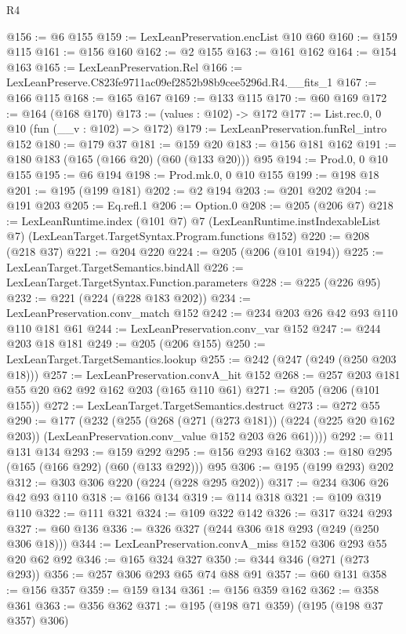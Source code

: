 \begin{lexlean}{R4}
\begin{coremodule}
@156 := @6 @155
@159 := LexLeanPreservation.encList @10 @60
@160 := @159 @115
@161 := @156 @160
@162 := @2 @155
@163 := @161 @162
@164 := @154 @163
@165 := LexLeanPreservation.Rel
@166 := LexLeanPreserve.C823fe9711ac09ef2852b98b9cee5296d.R4.__fits_1
@167 := @166 @115
@168 := @165 @167
@169 := @133 @115
@170 := @60 @169
@172 := @164 (@168 @170)
@173 := (values : @102) -> @172
@177 := List.rec.{0, 0} @10 (fun (__v : @102) => @172)
@179 := LexLeanPreservation.funRel_intro @152
@180 := @179 @37
@181 := @159 @20
@183 := @156 @181 @162
@191 := @180 @183 (@165 (@166 @20) (@60 (@133 @20))) @95
@194 := Prod.{0, 0} @10 @155
@195 := @6 @194
@198 := Prod.mk.{0, 0} @10 @155
@199 := @198 @18
@201 := @195 (@199 @181)
@202 := @2 @194
@203 := @201 @202
@204 := @191 @203
@205 := Eq.refl.{1}
@206 := Option.{0}
@208 := @205 (@206 @7)
@218 := LexLeanRuntime.index
    (@101 @7)
    @7
    (LexLeanRuntime.instIndexableList @7)
    (LexLeanTarget.TargetSyntax.Program.functions @152)
@220 := @208 (@218 @37)
@221 := @204 @220
@224 := @205 (@206 (@101 @194))
@225 := LexLeanTarget.TargetSemantics.bindAll
@226 := LexLeanTarget.TargetSyntax.Function.parameters
@228 := @225 (@226 @95)
@232 := @221 (@224 (@228 @183 @202))
@234 := LexLeanPreservation.conv_match @152
@242 := @234 @203 @26 @42 @93 @110 @110 @181 @61
@244 := LexLeanPreservation.conv_var @152
@247 := @244 @203 @18 @181
@249 := @205 (@206 @155)
@250 := LexLeanTarget.TargetSemantics.lookup
@255 := @242 (@247 (@249 (@250 @203 @18)))
@257 := LexLeanPreservation.convA_hit @152
@268 := @257 @203 @181 @55 @20 @62 @92 @162 @203 (@165 @110 @61)
@271 := @205 (@206 (@101 @155))
@272 := LexLeanTarget.TargetSemantics.destruct
@273 := @272 @55
@290 := @177
    (@232
      (@255
        (@268
          (@271 (@273 @181))
          (@224 (@225 @20 @162 @203))
          (LexLeanPreservation.conv_value @152 @203 @26 @61))))
@292 := @11 @131 @134
@293 := @159 @292
@295 := @156 @293 @162
@303 := @180 @295 (@165 (@166 @292) (@60 (@133 @292))) @95
@306 := @195 (@199 @293) @202
@312 := @303 @306 @220 (@224 (@228 @295 @202))
@317 := @234 @306 @26 @42 @93 @110
@318 := @166 @134
@319 := @114 @318
@321 := @109 @319 @110
@322 := @111 @321
@324 := @109 @322 @142
@326 := @317 @324 @293
@327 := @60 @136
@336 := @326 @327 (@244 @306 @18 @293 (@249 (@250 @306 @18)))
@344 := LexLeanPreservation.convA_miss @152 @306 @293 @55 @20 @62 @92
@346 := @165 @324 @327
@350 := @344 @346 (@271 (@273 @293))
@356 := @257 @306 @293 @65 @74 @88 @91
@357 := @60 @131
@358 := @156 @357
@359 := @159 @134
@361 := @156 @359 @162
@362 := @358 @361
@363 := @356 @362
@371 := @195 (@198 @71 @359) (@195 (@198 @37 @357) @306)

\end{coremodule}
\end{lexlean}
